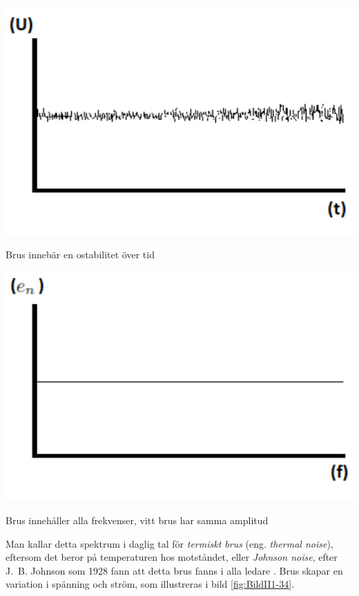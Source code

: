 \begin{marginfigure}
\includegraphics[width=\textwidth]{images/cropped_pdfs/bild_2_1-34.pdf}
\caption{Brus innebär en ostabilitet över tid}
\label{fig:BildII1-34}
\end{marginfigure}

\begin{marginfigure}
\includegraphics[width=\textwidth]{images/cropped_pdfs/bild_2_1-35.pdf}
\caption{Brus innehåller alla frekvenser, vitt brus har samma amplitud}
\label{fig:BildII1-35}
\end{marginfigure}

Man kallar detta spektrum i daglig tal för \emph{termiskt brus}
(eng. \emph{thermal noise}), eftersom det beror på temperaturen hos motståndet,
eller \emph{Johnson noise}, efter J.~B. Johnson som 1928 fann att detta brus
fanns i alla ledare \cite{ott1988}.
Brus skapar en variation i spänning och ström, som illustreras i bild
\ref{fig:BildII1-34}.

